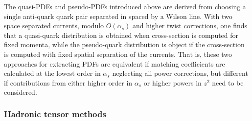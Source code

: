 The quasi-PDFs and pseudo-PDFs introduced above are derived from choosing a single anti-quark quark pair separated in spaced by a Wilson line.
With two space separated currents, modulo $O(\alpha_s)$ and higher twist corrections, one finds that a quasi-quark distribution is obtained when cross-section is computed for fixed momenta, while the pseudo-quark distribution is object if the cross-section is computed with fixed spatial separation of the currents.  
That is, these two approaches for extracting PDFs are equivalent if matching coefficients are calculated at the lowest order in $\alpha_s$ neglecting all power corrections, but different if contributions from either higher order in $\alpha_s$ or higher powers in $z^2$ need to be considered.

\subsubsection{Hadronic tensor methods}


